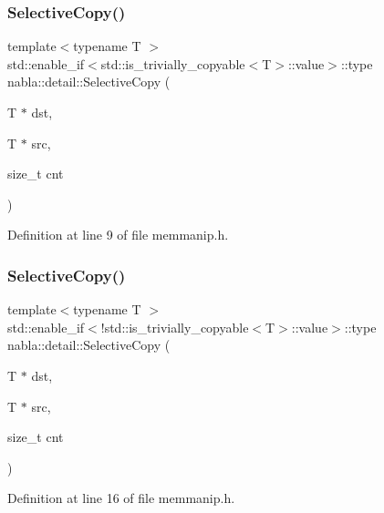 \subsubsection{\texorpdfstring{SelectiveCopy()}{SelectiveCopy()}\hspace{0.1cm}{\footnotesize\ttfamily [1/2]}}
{\footnotesize\ttfamily template$<$typename T $>$ \\
std\+::enable\+\_\+if$<$std\+::is\+\_\+trivially\+\_\+copyable$<$T$>$\+::value$>$\+::type nabla\+::detail\+::\+Selective\+Copy (\begin{DoxyParamCaption}\item[{T $\ast$}]{dst,  }\item[{T $\ast$}]{src,  }\item[{size\+\_\+t}]{cnt }\end{DoxyParamCaption})}



Definition at line 9 of file memmanip.\+h.

\mbox{\label{namespacenabla_1_1detail_a49314cb932a8a0cdb9a6f78defa31dc9}} 
\subsubsection{\texorpdfstring{SelectiveCopy()}{SelectiveCopy()}\hspace{0.1cm}{\footnotesize\ttfamily [2/2]}}
{\footnotesize\ttfamily template$<$typename T $>$ \\
std\+::enable\+\_\+if$<$!std\+::is\+\_\+trivially\+\_\+copyable$<$T$>$\+::value$>$\+::type nabla\+::detail\+::\+Selective\+Copy (\begin{DoxyParamCaption}\item[{T $\ast$}]{dst,  }\item[{T $\ast$}]{src,  }\item[{size\+\_\+t}]{cnt }\end{DoxyParamCaption})}



Definition at line 16 of file memmanip.\+h.

\mbox{\label{namespacenabla_1_1detail_aed72e71163857bccfe1c395dfdde5e95}} 
